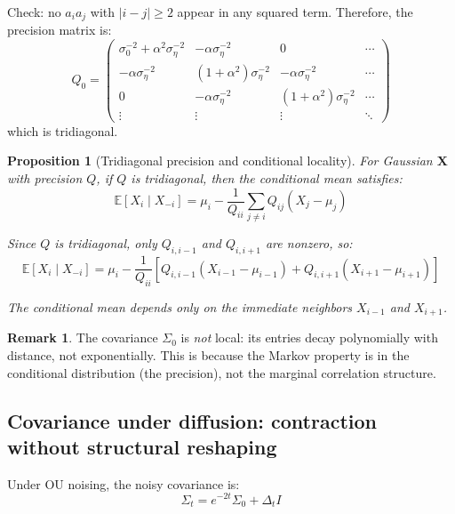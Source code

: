 \documentclass[11pt,a4paper]{article}
\theoremstyle{plain}
\newtheorem{proposition}[theorem]{Proposition}
\theoremstyle{definition}
\newtheorem{remark}[theorem]{Remark}
\newcommand{\Sig}{\Sigma}
\newcommand{\Prec}{Q}
\newcommand{\delt}{\Delta_t}
\newcommand{\vct}[1]{\mathbf{#1}}
\begin{document}
Check: no $a_i a_j$ with $|i - j| \ge 2$ appear in any squared term. Therefore, the precision matrix is:
\begin{equation}
\Prec_0 = \begin{pmatrix}
\sigma_0^{-2} + \alpha^2 \sigma_\eta^{-2} & -\alpha \sigma_\eta^{-2} & 0 & \cdots \\
-\alpha \sigma_\eta^{-2} & (1+\alpha^2)\sigma_\eta^{-2} & -\alpha \sigma_\eta^{-2} & \cdots \\
0 & -\alpha \sigma_\eta^{-2} & (1+\alpha^2)\sigma_\eta^{-2} & \cdots \\
\vdots & \vdots & \vdots & \ddots
\end{pmatrix}
\end{equation}
which is tridiagonal.

\begin{proposition}[Tridiagonal precision and conditional locality]
For Gaussian $\vct{X}$ with precision $\Prec$, if $\Prec$ is tridiagonal, then the conditional mean satisfies:
\begin{equation}
\mathbb{E}[X_i \mid X_{-i}] = \mu_i - \frac{1}{\Prec_{ii}} \sum_{j \ne i} \Prec_{ij} (X_j - \mu_j)
\end{equation}

Since $\Prec$ is tridiagonal, only $\Prec_{i,i-1}$ and $\Prec_{i,i+1}$ are nonzero, so:
\begin{equation}
\mathbb{E}[X_i \mid X_{-i}] = \mu_i - \frac{1}{\Prec_{ii}} \left[\Prec_{i,i-1}(X_{i-1} - \mu_{i-1}) + \Prec_{i,i+1}(X_{i+1} - \mu_{i+1})\right]
\end{equation}

The conditional mean depends only on the immediate neighbors $X_{i-1}$ and $X_{i+1}$.
\end{proposition}

\begin{remark}
The covariance $\Sig_0$ is \emph{not} local: its entries decay polynomially with distance, not exponentially. This is because the Markov property is in the conditional distribution (the precision), not the marginal correlation structure.
\end{remark}

\subsection{Covariance under diffusion: contraction without structural reshaping}
\label{sec:cov-diffusion}

Under OU noising, the noisy covariance is:
\begin{equation}
\Sig_t = e^{-2t} \Sig_0 + \delt I
\end{equation}
\end{document}
